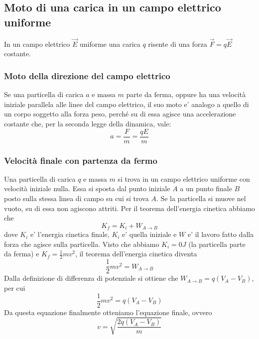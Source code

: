 \documentclass[a4paper, 10pt]{article}
\begin{document}
		\subsection{Moto di una carica in un campo elettrico uniforme}
			In un campo elettrico $\overrightarrow{E}$ uniforme una carica $q$ risente di una forza
			$\overrightarrow{F} =q\overrightarrow{E}$ costante.
			\subsubsection{Moto della direzione del campo elettrico}
			Se una particella di carica $a$ e massa $m$ parte da ferma, oppure ha una velocità iniziale parallela alle linee del
			campo elettrico, il suo moto e' analogo a quello di un corpo soggetto alla forza peso, perché su di essa agisce una
			accelerazione costante che, per la seconda legge della dinamica, vale:
				\[ a = \frac{F}{m} = \frac{qE}{m} \]
			\subsubsection{Velocità finale con partenza da fermo}
			Una particella di carica $q$ e massa $m$ si trova in un campo elettrico uniforme con velocità iniziale nulla. 
			Essa si sposta dal punto iniziale $A$ a un punto finale $B$ posto sulla stessa linea di campo su cui si trova $A$.
			Se la particella si muove nel vuoto, su di essa non agiscono attriti. Per il teorema dell'energia cinetica abbiamo che
			\[ K_f = K_i + W_{A \to B} \] dove $K_i$ e' l'energia cinetica finale, $K_i$ e' quella iniziale e $W$ e' 
			il lavoro fatto dalla forza che agisce sulla particella. Visto che abbiamo $K_i = 0J$ (la particella parte da ferma) 
			e $K_f = \frac{1}{2} mv^2$, il teorema dell'energia cinetica diventa 
			\[ \frac{1}{2}mv^2 = W_{A \to B} \]
			Dalla definizione di differenza di potenziale si ottiene che $W_{A \to B} = q(V_A - V_B)$, per cui
			\[ \frac{1}{2} mv^2 = q(V_A - V_B) \]
			Da questa equazione finalmente otteniamo l'equazione finale, ovvero
			\[ v = \sqrt{\frac{2q (V_A - V_B)}{m}} \]
\end{document}
